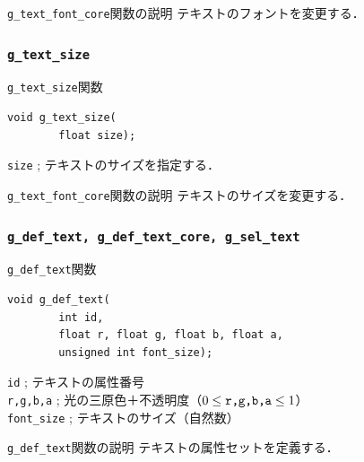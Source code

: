 \documentclass[platex,a4paper,12pt]{jsarticle}%
\begin{document}
\begin{itembox}[l]{\texttt{g\_text\_font\_core}関数の説明}
テキストのフォントを変更する．
\end{itembox}

\subsubsection{\texttt{g\_text\_size}}

\begin{itembox}[l]{\texttt{g\_text\_size}関数}
\begin{verbatim}
void g_text_size(
        float size);
\end{verbatim}
\verb|size| ; テキストのサイズを指定する．
\end{itembox}

\begin{itembox}[l]{\texttt{g\_text\_font\_core}関数の説明}
	テキストのサイズを変更する．
\end{itembox}


\clearpage
\subsubsection{\texttt{g\_def\_text, g\_def\_text\_core, g\_sel\_text}}

\begin{itembox}[l]{\texttt{g\_def\_text}関数}
\begin{verbatim}
void g_def_text(
        int id,
        float r, float g, float b, float a,
        unsigned int font_size);
\end{verbatim}
\verb|id| ; テキストの属性番号\\
\verb|r,g,b,a| ; 光の三原色＋不透明度（$0\leq \verb|r,g,b,a| \leq 1$）\\
\verb|font_size| ; テキストのサイズ（自然数）
\end{itembox}

\begin{itembox}[l]{\texttt{g\_def\_text}関数の説明}
テキストの属性セットを定義する．
\end{itembox}
\end{document}
